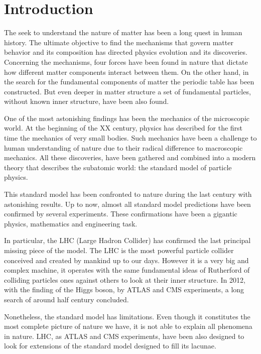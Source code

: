 \chapter*{Introduction}

The seek to understand the nature of matter has been a long quest in human history. The ultimate objective to find the mechanisms that govern matter behavior and its composition has directed physics evolution and its discoveries. Concerning the mechanisms, four forces have been found in nature that dictate how different matter components interact between them. On the other hand, in the search for the fundamental components of matter the periodic table has been constructed. But even deeper in matter structure a set of fundamental particles, without known inner structure, have been also found. 

One of the most astonishing findings has been the mechanics of the microscopic world. At the beginning of the XX century, physics has described for the first time the mechanics of very small bodies. Such mechanics have been a challenge to human understanding of nature due to their radical difference to macroscopic mechanics. All these discoveries, have been gathered and combined into a modern theory that describes the subatomic world: the standard model of particle physics. 

This standard model has been confronted to nature during the last century with astonishing results. Up to now, almost all standard model predictions have been confirmed by several experiments. These confirmations have been a gigantic physics, mathematics and engineering task.

In particular, the LHC (Large Hadron Collider) has confirmed the last principal missing piece of the model. The LHC is the most powerful particle collider conceived and created by mankind up to our days. However it is a very big and complex machine, it operates with the same fundamental ideas of Rutherford of colliding particles ones against others to look at their inner structure. In 2012, with the finding of the Higgs boson, by ATLAS and CMS experiments, a long search of around half century concluded.

Nonetheless, the standard model has limitations. Even though it constitutes the most complete picture of nature we have, it is not able to explain all phenomena in nature. LHC, as ATLAS and CMS experiments, have been also designed to look for extensions of the standard model designed to fill its lacunae. 

